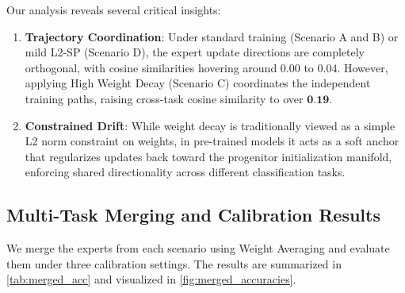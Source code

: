 \documentclass{article}
\theoremstyle{plain}
\theoremstyle{definition}
\theoremstyle{remark}
\begin{document}
Our analysis reveals several critical insights:
\begin{enumerate}
    \item \textbf{Trajectory Coordination}: Under standard training (Scenario A and B) or mild L2-SP (Scenario D), the expert update directions are completely orthogonal, with cosine similarities hovering around $0.00$ to $0.04$. However, applying High Weight Decay (Scenario C) coordinates the independent training paths, raising cross-task cosine similarity to over $\textbf{0.19}$.
    \item \textbf{Constrained Drift}: While weight decay is traditionally viewed as a simple L2 norm constraint on weights, in pre-trained models it acts as a soft anchor that regularizes updates back toward the progenitor initialization manifold, enforcing shared directionality across different classification tasks.
\end{enumerate}

\subsection{Multi-Task Merging and Calibration Results}
We merge the experts from each scenario using Weight Averaging and evaluate them under three calibration settings. The results are summarized in \cref{tab:merged_acc} and visualized in \cref{fig:merged_accuracies}.

\begin{table}[t]
\caption{Multi-Task Merged Model Average Test Accuracies (\%) across Calibration Settings}
\label{tab:merged_acc}
\vskip 0.15in
\begin{center}
\begin{small}
\end{small}
\end{center}
\vskip -0.1in
\end{table}
\end{document}

